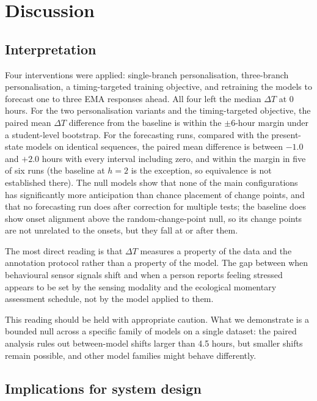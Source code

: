 \documentclass[preprint,12pt,authoryear]{elsarticle}
\newcommand{\dt}{$\Delta T$}
\begin{document}
\section{Discussion}

\subsection{Interpretation}

Four interventions were applied: single-branch personalisation,
three-branch personalisation, a timing-targeted training objective, and
retraining the models to forecast one to three EMA responses ahead. All
four left the median \dt{} at 0 hours. For the two personalisation
variants and the timing-targeted objective, the paired mean \dt{}
difference from the baseline is within the $\pm 6$-hour margin under a
student-level bootstrap. For the forecasting runs, compared with the
present-state models on identical sequences, the paired mean difference
is between $-1.0$ and $+2.0$ hours with every interval including zero,
and within the margin in five of six runs (the baseline at $h = 2$ is
the exception, so equivalence is not established there). The null
models show
that none of the main configurations has significantly more
anticipation than chance placement of change points, and that no
forecasting run does after correction for multiple tests; the baseline does show onset alignment
above the random-change-point null, so its change points are not
unrelated to the onsets, but they fall at or after them.

The most direct reading is that \dt{} measures a property of the data
and the annotation protocol rather than a property of the model. The
gap between when behavioural sensor signals shift and when a person
reports feeling stressed appears to be set by the sensing modality and
the ecological momentary assessment schedule, not by the model applied
to them.

This reading should be held with appropriate caution. What we
demonstrate is a bounded null across a specific family of models on a
single dataset: the paired analysis rules out between-model shifts
larger than 4.5 hours, but smaller shifts remain possible, and other
model families might behave differently.

\subsection{Implications for system design}
\end{document}
